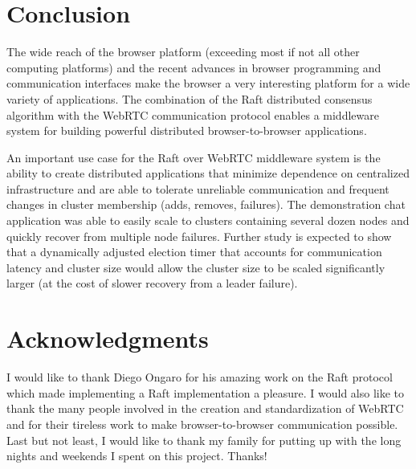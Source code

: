 \documentclass[conference,compsoc]{./IEEEtran/IEEEtran}
\begin{document}
\section{Conclusion}

The wide reach of the browser platform (exceeding most if not all
other computing platforms) and the recent advances in browser
programming and communication interfaces make the browser a very
interesting platform for a wide variety of applications. The
combination of the Raft distributed consensus algorithm with the
WebRTC communication protocol enables a middleware system for building
powerful distributed browser-to-browser applications.

An important use case for the Raft over WebRTC middleware system is
the ability to create distributed applications that minimize
dependence on centralized infrastructure and are able to tolerate
unreliable communication and frequent changes in cluster membership
(adds, removes, failures). The demonstration chat application was able
to easily scale to clusters containing several dozen nodes and quickly
recover from multiple node failures. Further study is expected to show
that a dynamically adjusted election timer that accounts for
communication latency and cluster size would allow the cluster size to
be scaled significantly larger (at the cost of slower recovery from
a leader failure).

\section*{Acknowledgments}

I would like to thank Diego Ongaro for his amazing work on the Raft
protocol which made implementing a Raft implementation a pleasure.
I would also like to thank the many people involved in the creation
and standardization of WebRTC and for their tireless work to make
browser-to-browser communication possible. Last but not least, I would
like to thank my family for putting up with the long nights and
weekends I spent on this project. Thanks!




\end{document}
